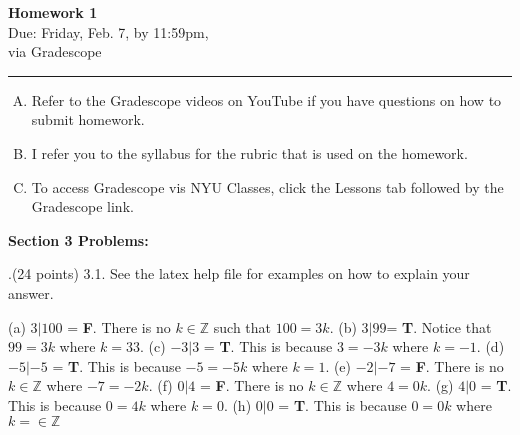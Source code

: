 \documentclass[12pt]{article}
\newif\ifshow
\begin{document}
\begin{center}
\ifshow
  \textbf{\Large Homework 0 Solution}\\
\else
  \textbf{\Large Homework 1}\\
\fi
Due: Friday, Feb. 7, by 11:59pm,\\via Gradescope\\
\end{center}

\hrule

\vspace{0.2cm}
\noindent
\begin{enumerate}[A.]
\item Refer to the Gradescope videos on YouTube if you have questions on how to submit homework.  
\item I refer you to the syllabus for the rubric that is used on the homework.  
\item To access Gradescope vis NYU Classes, click the Lessons tab followed by the Gradescope link. 
\end{enumerate}


\noindent \textbf{Section 3 Problems:} 
\vspace{.15in}

.(24 points) 3.1. See the latex help file for examples on how to explain your answer. 
\vspace{.15in}

\noindent (a) $3|100$ = \textbf{F}.  There is no $k \in \mathbb{Z}$ such that $100 = 3k$.
\newline (b) $3|99$= \textbf{T}.  Notice that $99 = 3k$ where $k = 33$. 
\newline (c) $-3|3$ = \textbf{T}. This is because $3 = -3k$ where $k= -1$. 
\newline (d) $-5|-5$ = \textbf{T}. This is because $-5 = -5k$ where $k = 1$. 
\newline (e) $-2|-7$ = \textbf{F}. There is no $k \in \mathbb{Z}$ where $-7 = -2k$. 
\newline (f) $0|4$ = \textbf{F}. There is no $k \in \mathbb{Z}$ where $4 = 0k$. 
\newline (g) $4|0$ = \textbf{T}. This is because $0 = 4k$ where $k=0$. 
\newline (h) $0|0$ = \textbf{T}. This is because $0 = 0k$ where $k= \in \mathbb{Z} $
\vspace{.15in}
\end{document}
